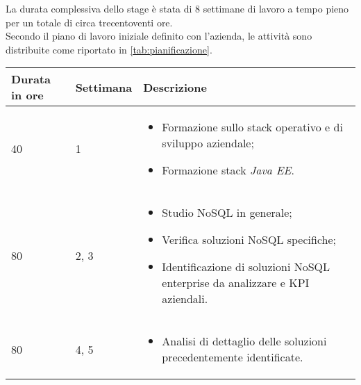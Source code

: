 La durata complessiva dello stage è stata di 8 settimane di lavoro a tempo pieno per un totale di circa trecentoventi ore.\\
\noindent Secondo il piano di lavoro iniziale definito con l'azienda, le attività sono distribuite come riportato in \autoref{tab:pianificazione}.\\

\begin{table}
\begin{center}

        \renewcommand{\arraystretch}{1.5}
    
        \centering
        \begin{longtable}{| C{2.5cm} | C{2cm} | L{7.2cm} | }
            
            \hline
            
            \textbf{Durata in ore} & \textbf{Settimana} & \textbf{Descrizione} \\
            
            \hline
            
            40 & 1 &
            \begin{itemize}[leftmargin=*]
                \item Formazione sullo stack operativo e di sviluppo aziendale;
                \item Formazione stack \textit{Java EE}.
            \end{itemize} \\
            
            \hline
            
            80 & 2, 3 &
            \begin{itemize}[leftmargin=*]
                \item Studio NoSQL in generale;
                \item Verifica soluzioni NoSQL specifiche;
                \item Identificazione di soluzioni NoSQL enterprise da analizzare e \gls{KPI} aziendali. 
            \end{itemize}  \\
            
            \hline
        
            
            80 & 4, 5 &
            \begin{itemize}[leftmargin=*]
                \item Analisi di dettaglio delle soluzioni precedentemente identificate. 
            \end{itemize}  \\
             

\end{longtable}
\end{center}
\end{table}
